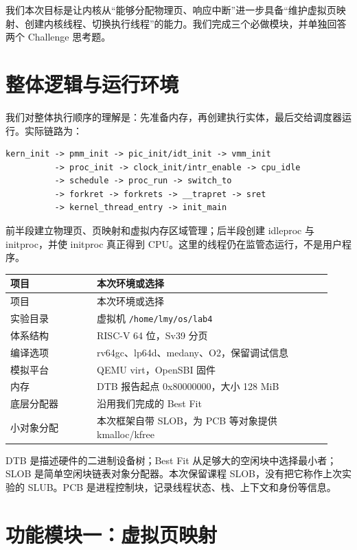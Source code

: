 \documentclass[UTF8,a4paper,10pt]{ctexart}
\begin{document}
我们本次目标是让内核从“能够分配物理页、响应中断”进一步具备“维护虚拟页映射、创建内核线程、切换执行线程”的能力。我们完成三个必做模块，并单独回答两个 Challenge 思考题。


\section{整体逻辑与运行环境}

我们对整体执行顺序的理解是：先准备内存，再创建执行实体，最后交给调度器运行。实际链路为：


\begin{lstlisting}
kern_init -> pmm_init -> pic_init/idt_init -> vmm_init
          -> proc_init -> clock_init/intr_enable -> cpu_idle
          -> schedule -> proc_run -> switch_to
          -> forkret -> forkrets -> __trapret -> sret
          -> kernel_thread_entry -> init_main
\end{lstlisting}

前半段建立物理页、页映射和虚拟内存区域管理；后半段创建 idleproc 与 initproc，并使 initproc 真正得到 CPU。这里的线程仍在监管态运行，不是用户程序。


{\small
\setlength{\tabcolsep}{3pt}
\renewcommand{\arraystretch}{1.22}
\begin{longtable}{>{\raggedright\arraybackslash}p{0.25\linewidth}>{\raggedright\arraybackslash}p{0.68\linewidth}}
\toprule
项目 & 本次环境或选择 \\
\midrule\endfirsthead
项目 & 本次环境或选择 \\
\midrule\endhead
实验目录 & 虚拟机 \nolinkurl{/home/lmy/os/lab4} \\
体系结构 & RISC-V 64 位，Sv39 分页 \\
编译选项 & rv64gc、lp64d、medany、O2，保留调试信息 \\
模拟平台 & QEMU virt，OpenSBI 固件 \\
内存 & DTB 报告起点 0x80000000，大小 128 MiB \\
底层分配器 & 沿用我们完成的 Best Fit \\
小对象分配 & 本次框架自带 SLOB，为 PCB 等对象提供 kmalloc/kfree \\
\bottomrule
\end{longtable}
}

DTB 是描述硬件的二进制设备树；Best Fit 从足够大的空闲块中选择最小者；SLOB 是简单空闲块链表对象分配器。本次保留课程 SLOB，没有把它称作上次实验的 SLUB。PCB 是进程控制块，记录线程状态、栈、上下文和身份等信息。


\section{功能模块一：虚拟页映射}
\end{document}
